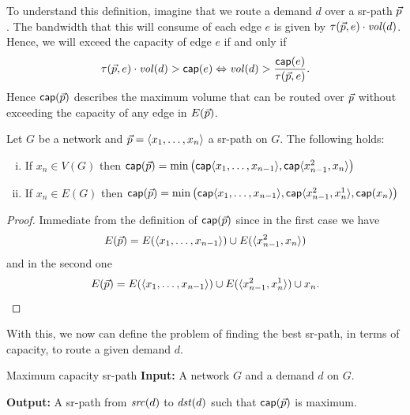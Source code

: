 To understand this definition, imagine that we route a demand $d$ over a sr-path $\vec{p}$.
The bandwidth that this will consume of each edge $e$ is given by $\tau(\vec{p}, e) \cdot \mathit{vol}(d)$.
Hence, we will exceed the capacity of edge $e$ if and only if 
$$
\tau(\vec{p}, e) \cdot \mathit{vol}(d) > \mathsf{cap}(e) \Leftrightarrow \mathit{vol}(d) > \frac{\mathsf{cap}(e)}{\tau(\vec{p}, e)} .
$$
Hence $\mathsf{cap}(\vec{p})$ describes the maximum volume that can be routed over $\vec{p}$ without exceeding the
capacity of any edge in $E(\vec{p})$.


\begin{lemma}
\label{lemma:srcap}
Let $G$ be a network and $\vec{p} = \langle x_1, \ldots, x_n \rangle$ a sr-path on $G$. The following holds:
\begin{enumerate}[i)]
 \item If $x_n \in V(G)$ then $\mathsf{cap}(\vec{p}) = \min \left( \mathsf{cap} \langle x_1, \ldots, x_{n - 1} \rangle, \mathsf{cap} \langle x^2_{n - 1}, x_n \rangle \right)$
 \item If $x_n \in E(G)$ then $\mathsf{cap}(\vec{p}) = \min \left( \mathsf{cap} \langle x_1, \ldots, x_{n - 1} \rangle, \mathsf{cap} \langle x^2_{n - 1}, x^1_n \rangle, \mathsf{cap}(x_n) \right)$
\end{enumerate}
\end{lemma}

\begin{proof}
Immediate from the definition of $\mathsf{cap}(\vec{p})$ since in the first case we have 
$$
E(\vec{p}) = E(\langle x_1, \ldots, x_{n - 1} \rangle) \cup E(\langle x^2_{n - 1}, x_n \rangle)
$$
and in the second one
$$
E(\vec{p}) = E(\langle x_1, \ldots, x_{n - 1} \rangle) \cup E(\langle x^2_{n - 1}, x^1_n \rangle) \cup x_n.
$$
\end{proof}

With this, we now can define the problem of finding the best sr-path, in terms of capacity, to route a given demand
$d$.

\begin{problem}{Maximum capacity sr-path}
\label{prob:max-cap-srp}
\textbf{Input:} A network $G$ and a demand $d$ on $G$.

\textbf{Output:} A sr-path from $\mathit{src}(d)$ to $\mathit{dst}(d)$ such that $\mathsf{cap}(\vec{p})$ is maximum.
\end{problem}

